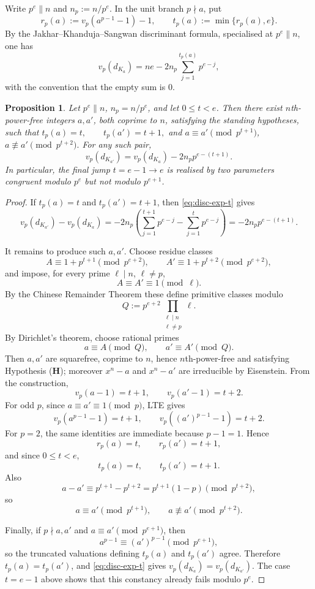 \documentclass[12pt,a4paper,oneside]{amsart}
\newtheorem{proposition}[theorem]{Proposition}
\theoremstyle{definition}
\begin{document}
Write \(p^e\parallel n\) and \(n_p:=n/p^e\).  In the unit branch \(p\nmid a\), put
\[
r_p(a):=v_p(a^{p-1}-1)-1,\qquad
t_p(a):=\min\{r_p(a),e\}.
\]
By the Jakhar--Khanduja--Sangwan discriminant formula, specialised at \(p^e\parallel n\),
one has
\begin{equation}\label{eq:disc-exp-t}
v_p(d_{K_a})
=
ne-2n_p\sum_{j=1}^{t_p(a)}p^{e-j},
\end{equation}
with the convention that the empty sum is \(0\).

\begin{proposition}
\label{prop:disc-jump}
Let \(p^e\parallel n\), \(n_p=n/p^e\), and let \(0\le t<e\).  Then there exist
\(n\)th-power-free integers \(a,a'\), both coprime to \(n\), satisfying the standing
hypotheses, such that \( t_p(a)=t,\qquad t_p(a')=t+1,\) and \(a\equiv a'\pmod {p^{t+1}}\), \(a\not\equiv a'\pmod {p^{t+2}}.\) For any such pair,
\[
v_p(d_{K_{a'}})
=
v_p(d_{K_a})-2n_p p^{e-(t+1)}.
\]
In particular, the final jump \(t=e-1\to e\) is realised by two parameters congruent
modulo \(p^e\) but not modulo \(p^{e+1}\).  
\end{proposition}

\begin{proof}
If \(t_p(a)=t\) and \(t_p(a')=t+1\), then \eqref{eq:disc-exp-t} gives
\[
v_p(d_{K_{a'}})-v_p(d_{K_a})
=
-2n_p
\left(
\sum_{j=1}^{t+1}p^{e-j}
-
\sum_{j=1}^{t}p^{e-j}
\right)
=
-2n_p p^{e-(t+1)}.
\]

It remains to produce such \(a,a'\).  Choose residue classes
\[
A\equiv 1+p^{t+1}\pmod {p^{e+2}},
\qquad
A'\equiv 1+p^{t+2}\pmod {p^{e+2}},
\]
and impose, for every prime \(\ell\mid n\), \(\ell\ne p\),
\[
A\equiv A'\equiv 1\pmod \ell .
\]
By the Chinese Remainder Theorem these define primitive classes modulo
\[
Q:=p^{e+2}\prod_{\substack{\ell\mid n\\ \ell\ne p}}\ell .
\]
By Dirichlet's theorem, choose rational primes
\[
a\equiv A\pmod Q,\qquad a'\equiv A'\pmod Q.
\]
Then \(a,a'\) are squarefree, coprime to \(n\), hence \(n\)th-power-free and satisfying
Hypothesis \textup{(\(\mathbf H\))}; moreover \(x^n-a\) and \(x^n-a'\) are irreducible by
Eisenstein. From the construction,
\[
v_p(a-1)=t+1,\qquad v_p(a'-1)=t+2.
\]
For odd \(p\), since \(a\equiv a'\equiv1\pmod p\), LTE gives
\[
v_p(a^{p-1}-1)=t+1,\qquad
v_p((a')^{p-1}-1)=t+2.
\]
For \(p=2\), the same identities are immediate because \(p-1=1\).  Hence
\[
r_p(a)=t,\qquad r_p(a')=t+1,
\]
and since \(0\le t<e\),
\[
t_p(a)=t,\qquad t_p(a')=t+1.
\]
Also
\[
a-a'\equiv p^{t+1}-p^{t+2}=p^{t+1}(1-p)\pmod {p^{t+2}},
\]
so
\[
a\equiv a'\pmod {p^{t+1}},
\qquad
a\not\equiv a'\pmod {p^{t+2}}.
\]

Finally, if \(p\nmid a,a'\) and \(a\equiv a'\pmod {p^{e+1}}\), then
\[
a^{p-1}\equiv (a')^{p-1}\pmod {p^{e+1}},
\]
so the truncated valuations defining \(t_p(a)\) and \(t_p(a')\) agree.  Therefore
\(t_p(a)=t_p(a')\), and \eqref{eq:disc-exp-t} gives
\(v_p(d_{K_a})=v_p(d_{K_{a'}})\).  The case \(t=e-1\) above shows that this constancy
already fails modulo \(p^e\).
\end{proof}
\end{document}
